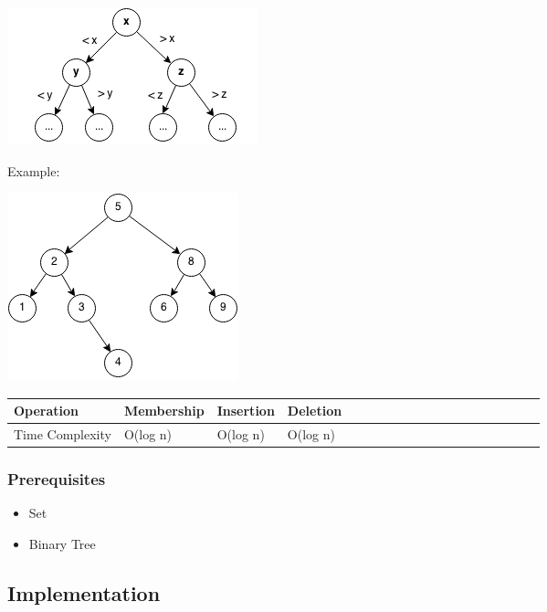 \documentclass[11pt,oneside]{book}
\makeatletter
\def\maxwidth#1{\ifdim\Gin@nat@width>#1 #1\else\Gin@nat@width\fi}
\makeatother
\begin{document}
\vspace{5px}\includegraphics[width=\maxwidth{\textwidth}]{bstcompare.png}

Example:

\vspace{5px}\includegraphics[width=\maxwidth{\textwidth}]{bst.png}

\vspace{10px}\begin{tabulary}{0.4\linewidth}{|l|l|l|l|l|l|l|l|l|l|l|l|l|l|l|l|l|l|l}\hline


  Operation &
  Membership &
  Insertion &
  Deletion\\
\hline


  Time Complexity &
  O(log n) &
  O(log n) &
  O(log n)\\

\hline\end{tabulary}

\subsubsection{Prerequisites}

\begin{itemize}
\item Set
\item Binary Tree
\end{itemize}

\subsection{Implementation}
\end{document}
